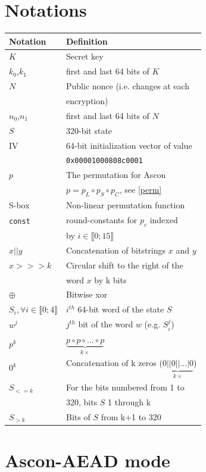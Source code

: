 \documentclass[11pt,technote]{IEEEtran}
\begin{document}
		\section{Notations} \label{notations}
		\begin{tabular}{ll}
				\hline
				\textbf{Notation}&\textbf{Definition}\\
				\hline
				$K$&Secret key\\
				$k_0$,$k_1$&first and last 64 bits of $K$\\
				$N$&Public nonce (i.e. changes at each\\
				&encryption)\\
				$n_0$,$n_1$&first and last 64 bits of $N$\\
				$S$&320-bit state\\
				IV&64-bit initialization vector of value\\
				&\verb|0x00001000808c0001|\\
				$p$&The permutation for Ascon \\
				&$p=p_L \circ p_S \circ p_C$, see \ref{perm}\\
				S-box&Non-linear permutation function\\
				\verb|const|&round-constants for $p_c$ indexed \\
				&by $i \in \llbracket 0;15 \rrbracket$ \\
				\hline
				$x||y$&Concatenation of bitstrings $x$ and $y$\\
				$x>>>k$&Circular shift to the right of the\\
				&word $x$ by k bits\\
				$\oplus$&Bitwise xor\\
				\hline
				$S_i, \forall i \in \llbracket 0;4 \rrbracket$&$i^{th}$ 64-bit word of the state $S$\\
				$w^j$&$j^{th}$ bit of the word $w$ (e.g. $S_i^j$) \\
				$p^k$&$\underbrace{p \circ p \circ ... \circ p}_{k \times}$\\
				$0^k$&Concatenation of k zeros ($\underbrace{0||0|| ... |0}_{k \times}$)\\
				$S_{<=k}$&For the bits numbered from 1 to\\
				&320, bits $S$ 1 through k\\
				$S_{>k}$&Bits of $S$ from k+1 to 320\\
				\hline
			\end{tabular}
			
		
		\section{Ascon-AEAD mode}
		
\end{document}
